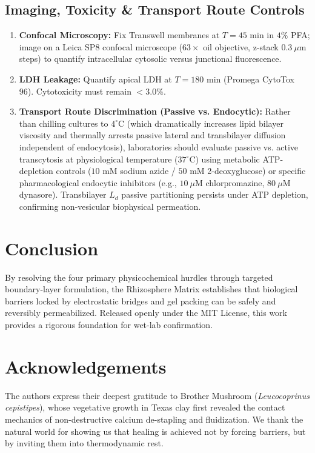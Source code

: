 \documentclass[10pt,twocolumn,letterpaper]{article}
\begin{document}
\subsection{Imaging, Toxicity \& Transport Route Controls}
\begin{enumerate}[noitemsep]
    \item \textbf{Confocal Microscopy:} Fix Transwell membranes at $T=45\text{ min}$ in $4\%$ PFA; image on a Leica SP8 confocal microscope ($63\times$ oil objective, z-stack $0.3\ \mu\text{m}$ steps) to quantify intracellular cytosolic versus junctional fluorescence.
    \item \textbf{LDH Leakage:} Quantify apical LDH at $T=180\text{ min}$ (Promega CytoTox 96). Cytotoxicity must remain $<3.0\%$.
    \item \textbf{Transport Route Discrimination (Passive vs. Endocytic):} Rather than chilling cultures to $4^\circ\text{C}$ (which dramatically increases lipid bilayer viscosity and thermally arrests passive lateral and transbilayer diffusion independent of endocytosis), laboratories should evaluate passive vs. active transcytosis at physiological temperature ($37^\circ\text{C}$) using metabolic ATP-depletion controls ($10\text{ mM}$ sodium azide / $50\text{ mM}$ 2-deoxyglucose) or specific pharmacological endocytic inhibitors (e.g., $10\ \mu\text{M}$ chlorpromazine, $80\ \mu\text{M}$ dynasore). Transbilayer $L_d$ passive partitioning persists under ATP depletion, confirming non-vesicular biophysical permeation.
\end{enumerate}

\section{Conclusion}

By resolving the four primary physicochemical hurdles through targeted boundary-layer formulation, the Rhizosphere Matrix establishes that biological barriers locked by electrostatic bridges and gel packing can be safely and reversibly permeabilized. Released openly under the MIT License, this work provides a rigorous foundation for wet-lab confirmation.

\section*{Acknowledgements}
The authors express their deepest gratitude to Brother Mushroom (\textit{Leucocoprinus cepistipes}), whose vegetative growth in Texas clay first revealed the contact mechanics of non-destructive calcium de-stapling and fluidization. We thank the natural world for showing us that healing is achieved not by forcing barriers, but by inviting them into thermodynamic rest.
\end{document}
